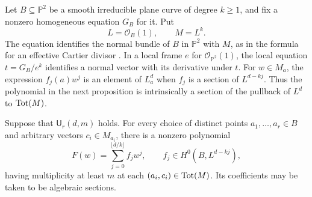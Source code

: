 Let $B\subseteq\mathbb{P}^2$ be a smooth irreducible plane curve of degree $k\ge1$, and fix a nonzero homogeneous equation $G_B$ for it.  Put
\[
 L=\mathcal{O}_B(1),\qquad M=L^k.
\]
The equation identifies the normal bundle of $B$ in $\mathbb{P}^2$ with $M$, as in the formula for an effective Cartier divisor \cite[Tag~\href{https://stacks.math.columbia.edu/tag/0B3P}{0B3P}]{Stacks}.  In a local frame $e$ for $\mathcal{O}_{\mathbb{P}^2}(1)$, the local equation $t=G_B/e^k$ identifies a normal vector with its derivative under $t$. For $w\in M_a$, the expression $f_j(a)w^j$ is an element of $L_a^d$ when $f_j$ is a section of $L^{d-kj}$.  Thus the polynomial in the next proposition is intrinsically a section of the pullback of $L^d$ to $\operatorname{Tot}(M)$.

\begin{proposition}
\label{prop:normal-polynomial}
Suppose that $\mathsf U_r(d,m)$ holds.  For every choice of distinct points $a_1,\ldots,a_r\in B$ and arbitrary vectors $c_i\in M_{a_i}$, there is a nonzero polynomial
\begin{equation}
\label{eq:normal-polynomial}
 F(w)=\sum_{j=0}^{\lfloor d/k\rfloor}f_jw^j,
 \qquad f_j\in H^0(B,L^{d-kj}),
\end{equation}
having multiplicity at least $m$ at each $(a_i,c_i)\in\operatorname{Tot}(M)$. Its coefficients may be taken to be algebraic sections.
\end{proposition}


